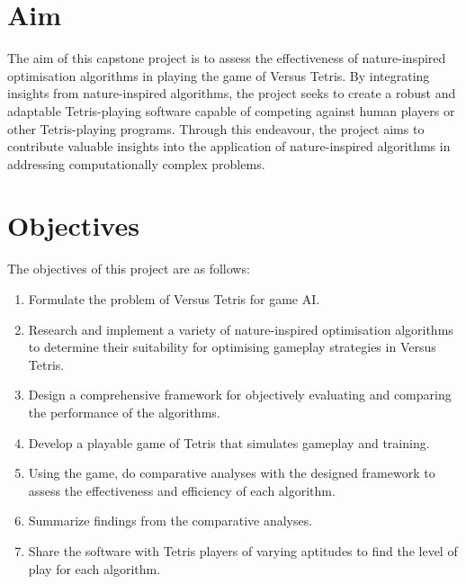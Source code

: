 \documentclass[a4paper, 12pt]{extreport}
\begin{document}
		\section{Aim}
		
			
			The aim of this capstone project is to assess the effectiveness of nature-inspired optimisation algorithms in playing the game of Versus Tetris. By integrating insights from nature-inspired algorithms, the project seeks to create a robust and adaptable Tetris-playing software capable of competing against human players or other Tetris-playing programs. Through this endeavour, the project aims to contribute valuable insights into the application of nature-inspired algorithms in addressing computationally complex problems.
		
		\section{Objectives}
		
			
			The objectives of this project are as follows:
			
			\begin{enumerate}
				\item Formulate the problem of Versus Tetris for game AI.
				\item Research and implement a variety of nature-inspired optimisation algorithms to determine their suitability for optimising gameplay strategies in Versus Tetris.
				\item Design a comprehensive framework for objectively evaluating and comparing the performance of the algorithms.
				\item Develop a playable game of Tetris that simulates gameplay and training.
				\item Using the game, do comparative analyses with the designed framework to assess the effectiveness and efficiency of each algorithm.
				\item Summarize findings from the comparative analyses.
				\item Share the software with Tetris players of varying aptitudes to find the level of play for each algorithm.
			\end{enumerate}
		
\end{document}

